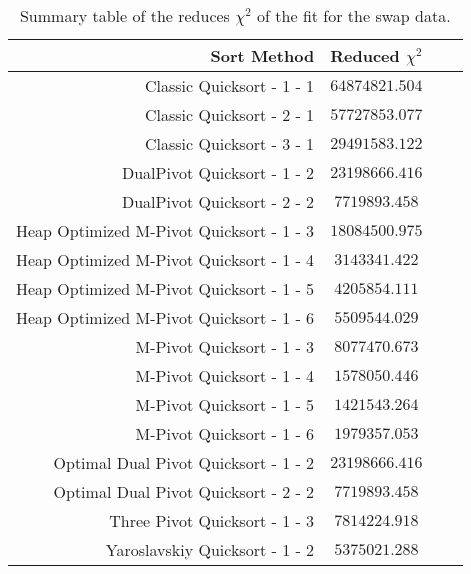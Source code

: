 	\begin{table}
		\begin{center}
			\begin{tabular}{|r|c|c|c}
				\hline
								Sort Method              &    Reduced $\chi^{2}$      \\ \hline \hline
				                Classic Quicksort - 1 - 1 &  $ 64874821.504$ \\ \hline
				                Classic Quicksort - 2 - 1 &  $ 57727853.077$ \\ \hline
				                Classic Quicksort - 3 - 1 &  $ 29491583.122$ \\ \hline
				              DualPivot Quicksort - 1 - 2 &  $ 23198666.416$ \\ \hline
				              DualPivot Quicksort - 2 - 2 &  $ 7719893.458$ \\ \hline
				 Heap Optimized M-Pivot Quicksort - 1 - 3 &  $ 18084500.975$ \\ \hline
				 Heap Optimized M-Pivot Quicksort - 1 - 4 &  $ 3143341.422$ \\ \hline
				 Heap Optimized M-Pivot Quicksort - 1 - 5 &  $ 4205854.111$ \\ \hline
				 Heap Optimized M-Pivot Quicksort - 1 - 6 &  $ 5509544.029$ \\ \hline
				                M-Pivot Quicksort - 1 - 3 &  $ 8077470.673$ \\ \hline
				                M-Pivot Quicksort - 1 - 4 &  $ 1578050.446$ \\ \hline
				                M-Pivot Quicksort - 1 - 5 &  $ 1421543.264$ \\ \hline
				                M-Pivot Quicksort - 1 - 6 &  $ 1979357.053$ \\ \hline
				     Optimal Dual Pivot Quicksort - 1 - 2 &  $ 23198666.416$ \\ \hline
				     Optimal Dual Pivot Quicksort - 2 - 2 &  $ 7719893.458$ \\ \hline
				            Three Pivot Quicksort - 1 - 3 &  $ 7814224.918$ \\ \hline
				           Yaroslavskiy Quicksort - 1 - 2 &  $ 5375021.288$ \\ \hline
			\end{tabular}
			\caption{Summary table of the reduces $\chi^{2}$ of the fit for the swap data.}
			\label{tab:swapFitCoeffChiSq}
		\end{center}
	\end{table}















